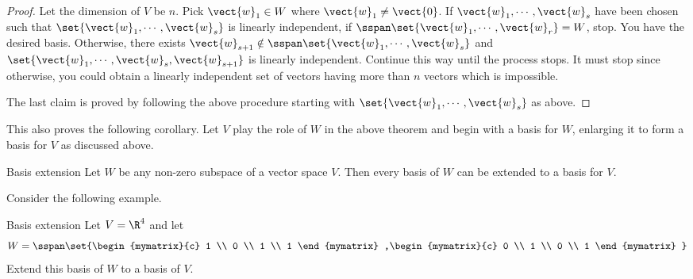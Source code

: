 \begin{proof}
Let the dimension of $V$ be $n$. Pick $\vect{w}_{1}\in W$
where $\vect{w}_{1}\neq \vect{0}$. If $\vect{w}_{1},\cdots ,\vect{w}_{s}$ have
been chosen such that $\set{\vect{w}_{1},\cdots ,\vect{w}_{s}} $ is
linearly independent, if $\sspan\set{\vect{w}_{1},\cdots ,\vect{w}
_{r}} =W$, stop. You have the desired basis. Otherwise, there exists $
\vect{w}_{s+1}\notin \sspan\set{\vect{w}_{1},\cdots ,\vect{w}
_{s}} $ and $\set{\vect{w}_{1},\cdots ,
\vect{w}_{s},\vect{w}_{s+1}} $ is linearly independent. Continue this
way until the process stops. It must stop since otherwise, you could obtain a
linearly independent set of vectors having more than $n$ vectors which is
impossible.

The last claim is proved by following the above procedure starting with $
\set{\vect{w}_{1},\cdots ,\vect{w}_{s}} $ as above. 
\end{proof}

This also proves the following corollary. Let $V$ play the role of $
W$ in the above theorem and begin with a basis for $W$, enlarging it to form
a basis for $V$ as discussed above.

\begin{corollary}{Basis extension}{}
Let $W$ be any non-zero subspace of a vector space $V$.
Then every basis of $W$ can be extended to a basis for $V$.
\end{corollary}

Consider the following example.

\begin{example}{Basis extension}{}
Let $V=\R^{4}$ and let 
\begin{equation*}
W=\sspan\set{\begin{mymatrix}{c}
1 \\ 
0 \\ 
1 \\ 
1
\end{mymatrix} ,\begin{mymatrix}{c}
0 \\ 
1 \\ 
0 \\ 
1
\end{mymatrix} }
\end{equation*}
Extend this basis of $W$ to a basis of $V$.
\end{example}

